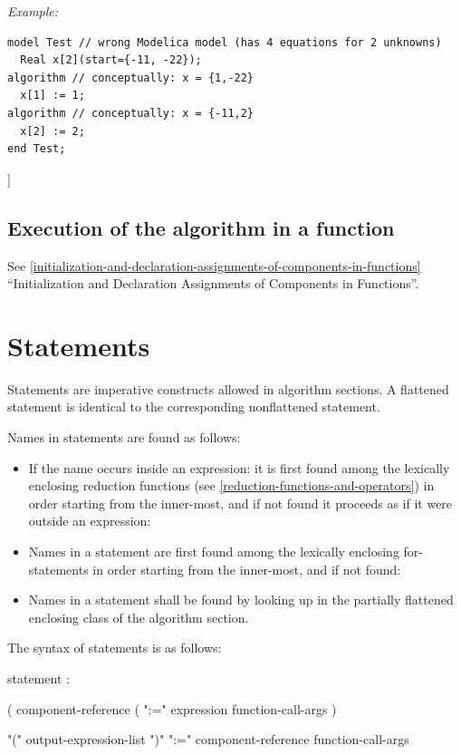 \documentclass[10pt,a4paper]{report}
\def\doublelabel#1{\label{#1}}
\begin{document}
\emph{Example:}

\begin{lstlisting}[language=modelica]
model Test // wrong Modelica model (has 4 equations for 2 unknowns)
  Real x[2](start={-11, -22});
algorithm // conceptually: x = {1,-22}
  x[1] := 1;
algorithm // conceptually: x = {-11,2}
  x[2] := 2;
end Test;
\end{lstlisting}
{]}

\subsection{Execution of the algorithm in a function}\doublelabel{execution-of-the-algorithm-in-a-function}

See \ref{initialization-and-declaration-assignments-of-components-in-functions} ``Initialization and Declaration Assignments of
Components in Functions''.

\section{Statements}\doublelabel{statements}

Statements are imperative constructs allowed in algorithm sections. A
flattened statement is identical to the corresponding nonflattened
statement.

Names in statements are found as follows:

\begin{itemize}
\item
  If the name occurs inside an expression: it is first found among the
  lexically enclosing reduction functions (see \ref{reduction-functions-and-operators}) in order
  starting from the inner-most, and if not found it proceeds as if it
  were outside an expression:
\item
  Names in a statement are first found among the lexically enclosing
  for-statements in order starting from the inner-most, and if not
  found:
\item
  Names in a statement shall be found by looking up in the partially
  flattened enclosing class of the algorithm section.
\end{itemize}

The syntax of statements is as follows:

statement :

( component-reference ( ":=" expression \textbar{} function-call-args )

\textbar{} "(" output-expression-list ")" ":=" component-reference
function-call-args
\end{document}
